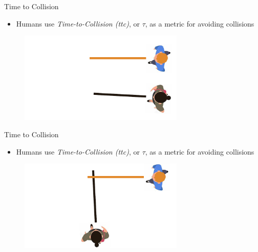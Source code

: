\documentclass[aspectratio=169,xcolor=dvipsnames]{beamer}
\begin{document}
\begin{frame}{Time to Collision}
  \begin{itemize}
    \item Humans use \textit{Time-to-Collision (ttc)}, or $\tau$, as a metric for avoiding collisions
  \end{itemize}
  \begin{figure}
    \includegraphics[width=0.7\textwidth]{imgs/ttc_far.png}
  \end{figure}
\end{frame}

\begin{frame}{Time to Collision}
  \begin{itemize}
    \item Humans use \textit{Time-to-Collision (ttc)}, or $\tau$, as a metric for avoiding collisions
  \end{itemize}
  \begin{figure}
    \includegraphics[width=0.7\textwidth]{imgs/ttc_close.png}
  \end{figure}
\end{frame}
\end{document}
